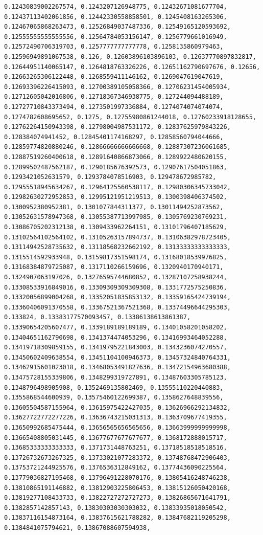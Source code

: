\documentclass[11pt]{article}
\begin{document}
\begin{Verbatim}[commandchars=\\\{\}]
0.12430839002267574, 0.1243207126948775, 0.12432671081677704, 0.12437113402061856, 0.12442330558858501, 0.1245408163265306, 0.12467065868263473, 0.12526849037487336, 0.12549165120593692, 0.12555555555555556, 0.12564784053156147, 0.1256779661016949, 0.12572490706319703, 0.1257777777777778, 0.1258135860979463, 0.12596949891067538, 0.126, 0.12603896103896103, 0.12637770897832817, 0.12644951140065147, 0.1264818763326226, 0.12651162790697676, 0.12656, 0.12663265306122448, 0.1268559411146162, 0.1269047619047619, 0.12693396226415093, 0.12700389105058366, 0.12706231454005934, 0.12712605042016806, 0.12718367346938775, 0.127244094488189, 0.12727710843373494, 0.1273501997336884, 0.1274074074074074, 0.1274782608695652, 0.1275, 0.12755980861244018, 0.12760233918128655, 0.12762264150943398, 0.12798004987531172, 0.12837625979843226, 0.128384074941452, 0.12845401174168297, 0.12858560794044666, 0.12859774820880246, 0.12866666666666668, 0.12887307236061685, 0.12887519260400618, 0.12891640866873066, 0.1289922480620155, 0.12899502487562187, 0.1290185676392573, 0.12907617504051863, 0.1293421052631579, 0.1293784078516903, 0.129478672985782, 0.12955518945634267, 0.12964125560538117, 0.12980306345733042, 0.12982630272952853, 0.12995121951219513, 0.1300398406374502, 0.1300952380952381, 0.1301077844311377, 0.13011494252873562, 0.13052631578947368, 0.13055387713997985, 0.1305769230769231, 0.13086705202312138, 0.1309433962264151, 0.13101796407185629, 0.13102564102564102, 0.13105263157894737, 0.13106382978723405, 0.13114942528735632, 0.13118568232662192, 0.13133333333333333, 0.1315514592933948, 0.13159817351598174, 0.13168018539976825, 0.13168384879725087, 0.1317110266159696, 0.1320940170940171, 0.1324907063197026, 0.13276595744680852, 0.13287107258938244, 0.13308533916849016, 0.13309309309309308, 0.1331772575250836, 0.13320056899004268, 0.13352051835853132, 0.13359165424739194, 0.13360406091370558, 0.13367521367521368, 0.13374496644295303, 0.133824, 0.13383177570093457, 0.13386138613861387, 0.13390654205607477, 0.1339189189189189, 0.13401058201058202, 0.13404651162790698, 0.1341374474053296, 0.13416993464052288, 0.13419718309859155, 0.13419795221843003, 0.1343236074270557, 0.13450602409638554, 0.13451104100946373, 0.13457324840764331, 0.13462915601023018, 0.13468053491827636, 0.13472154963680388, 0.13475728155339806, 0.1348299319727891, 0.13487603305785123, 0.1348796498905908, 0.1352469135802469, 0.13555110220440883, 0.1355868544600939, 0.13575460122699387, 0.1358627648839556, 0.13605504587155964, 0.13615975422427035, 0.13626966292134832, 0.13627722772277226, 0.13636743215031313, 0.1363709677419355, 0.13650992685475444, 0.13656565656565656, 0.13663999999999998, 0.13665408805031445, 0.13677677677677677, 0.1368172888015717, 0.13685333333333333, 0.1371731448763251, 0.13718518518518516, 0.13726732673267325, 0.13733021077283372, 0.13748768472906403, 0.13753721244925576, 0.1376536312849162, 0.13774436090225564, 0.13779036827195468, 0.13796491228070176, 0.13805416248746238, 0.13810865191146882, 0.13812903225806453, 0.13815126050420168, 0.13819277108433733, 0.13822727272727273, 0.13826865671641791, 0.1382857142857143, 0.13830303030303032, 0.13833935018050542, 0.13837116154873164, 0.13837615621788282, 0.13847682119205298, 0.1384841075794621, 0.13867088607594938, 
\end{Verbatim}
\end{document}
